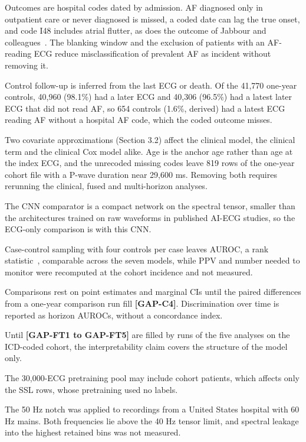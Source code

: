 \documentclass[preprint,12pt]{elsarticle}
\begin{document}
Outcomes are hospital codes dated by admission. AF diagnosed only in outpatient care or never diagnosed is missed, a coded date can lag the true onset, and code I48 includes atrial flutter, as does the outcome of Jabbour and colleagues~\cite{jabbour2024}. The blanking window and the exclusion of patients with an AF-reading ECG reduce misclassification of prevalent AF as incident without removing it.

Control follow-up is inferred from the last ECG or death. Of the 41,770 one-year controls, 40,960 (98.1\%) had a later ECG and 40,306 (96.5\%) had a latest later ECG that did not read AF, so 654 controls (1.6\%, derived) had a latest ECG reading AF without a hospital AF code, which the coded outcome misses.

Two covariate approximations (Section 3.2) affect the clinical model, the clinical term and the clinical Cox model alike. Age is the anchor age rather than age at the index ECG, and the unrecoded missing codes leave 819 rows of the one-year cohort file with a P-wave duration near 29,600 ms. Removing both requires rerunning the clinical, fused and multi-horizon analyses.

The CNN comparator is a compact network on the spectral tensor, smaller than the architectures trained on raw waveforms in published AI-ECG studies, so the ECG-only comparison is with this CNN.

Case-control sampling with four controls per case leaves AUROC, a rank statistic~\cite{hanley1982}, comparable across the seven models, while PPV and number needed to monitor were recomputed at the cohort incidence and not measured.

Comparisons rest on point estimates and marginal CIs until the paired differences from a one-year comparison run fill \textbf{[GAP-C4]}. Discrimination over time is reported as horizon AUROCs, without a concordance index.

Until \textbf{[GAP-FT1 to GAP-FT5]} are filled by runs of the five analyses on the ICD-coded cohort, the interpretability claim covers the structure of the model only.

The 30,000-ECG pretraining pool may include cohort patients, which affects only the SSL rows, whose pretraining used no labels.

The 50 Hz notch was applied to recordings from a United States hospital with 60 Hz mains. Both frequencies lie above the 40 Hz tensor limit, and spectral leakage into the highest retained bins was not measured.
\end{document}
